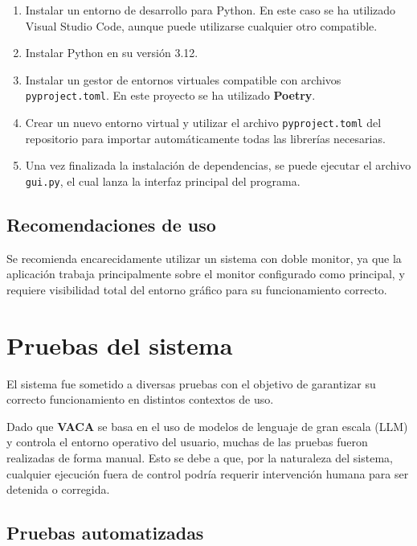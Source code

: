 \begin{enumerate}
    \item Instalar un entorno de desarrollo para Python. En este caso se ha utilizado Visual Studio Code, aunque puede utilizarse cualquier otro compatible.
    \item Instalar Python en su versión 3.12. \cite{python312}
    
    \item Instalar un gestor de entornos virtuales compatible con archivos \texttt{pyproject.toml}. En este proyecto se ha utilizado \textbf{Poetry}\cite{poetryDocs}.
    
    \item Crear un nuevo entorno virtual y utilizar el archivo \texttt{pyproject.toml} del repositorio para importar automáticamente todas las librerías necesarias.
    
    \item Una vez finalizada la instalación de dependencias, se puede ejecutar el archivo \texttt{gui.py}, el cual lanza la interfaz principal del programa.
\end{enumerate}

\subsection{Recomendaciones de uso}

Se recomienda encarecidamente utilizar un sistema con doble monitor, ya que la aplicación trabaja principalmente sobre el monitor configurado como principal, y requiere visibilidad total del entorno gráfico para su funcionamiento correcto.

\section{Pruebas del sistema}

El sistema fue sometido a diversas pruebas con el objetivo de garantizar su correcto funcionamiento en distintos contextos de uso.

Dado que \textbf{VACA} se basa en el uso de modelos de lenguaje de gran escala (LLM) y controla el entorno operativo del usuario, muchas de las pruebas fueron realizadas de forma manual. Esto se debe a que, por la naturaleza del sistema, cualquier ejecución fuera de control podría requerir intervención humana para ser detenida o corregida.

\subsection{Pruebas automatizadas}

